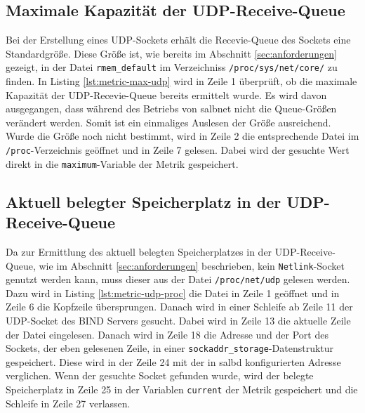 \documentclass[a4paper, 12pt, BCOR10mm, DIV12, toc=bibliography, toc=listof, german]{scrbook}
\begin{document}
			\subsection*{Maximale Kapazität der UDP-Receive-Queue} %

			Bei der Erstellung eines UDP-Sockets erhält die Recevie-Queue des Sockets eine Standardgröße.
			Diese Größe ist, wie bereits im Abschnitt \ref{sec:anforderungen} gezeigt, in der Datei
			\texttt{rmem\_default} im Verzeichniss \texttt{/proc/sys/net/core/} zu finden. In Listing
			\ref{lst:metric-max-udp} wird in Zeile 1 überprüft, ob die maximale Kapazität der
			UDP-Recevie-Queue bereits ermittelt wurde.  Es wird davon ausgegangen, dass während des Betriebs von
			salbnet nicht die Queue-Größen verändert werden. Somit ist ein einmaliges Auslesen der Größe
			ausreichend. Wurde die Größe noch nicht bestimmt, wird in Zeile 2 die entsprechende Datei im
			\texttt{/proc}-Verzeichnis geöffnet und in Zeile 7 gelesen. Dabei wird der gesuchte Wert
			direkt in die \texttt{maximum}-Variable der Metrik gespeichert.

			


			\subsection*{Aktuell belegter Speicherplatz in der UDP-Receive-Queue} %

				Da zur Ermittlung des aktuell belegten Speicherplatzes in der UDP-Receive-Queue, wie im
				Abschnitt \ref{sec:anforderungen} beschrieben, kein \texttt{Netlink}-Socket genutzt werden
				kann, muss dieser aus der Datei \texttt{/proc/net/udp} gelesen werden. Dazu wird in Listing
				\ref{lst:metric-udp-proc} die Datei in Zeile 1 geöffnet und in Zeile 6 die Kopfzeile
				übersprungen. Danach wird in einer Schleife ab Zeile 11 der UDP-Socket des BIND Servers
				gesucht. Dabei wird in Zeile 13 die aktuelle Zeile der Datei eingelesen. Danach wird in
				Zeile 18 die Adresse und der Port des Sockets, der eben gelesenen Zeile, in einer
				\texttt{sockaddr\_storage}-Datenstruktur gespeichert. Diese wird in der Zeile 24 mit der in
				salbd konfigurierten Adresse verglichen. Wenn der gesuchte Socket gefunden wurde, wird der
				belegte Speicherplatz in Zeile 25 in der Variablen \texttt{current} der Metrik gespeichert
				und die Schleife in Zeile 27 verlassen.
\end{document}
